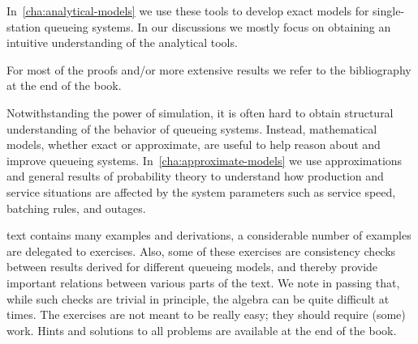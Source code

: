 \documentclass[queueing-book.tex]{subfiles}
\begin{document}
In~\cref{cha:analytical-models} we use these tools to develop exact models for single-station queueing systems.
In our discussions we mostly focus on obtaining an intuitive understanding of the analytical tools.

For most of the  proofs and/or more extensive results we refer to the bibliography at the end of the book.

Notwithstanding the power of simulation, it is often hard to obtain structural understanding of the behavior of queueing systems.
Instead, mathematical models, whether exact or approximate, are useful to help reason about and improve queueing systems.
In~\cref{cha:approximate-models} we use approximations and general results of probability theory to understand how production and service situations are affected by the system parameters such as service speed, batching rules, and outages.


 text contains many examples and derivations, a considerable number of examples are delegated to exercises.
Also, some of these exercises are consistency checks between results derived for different queueing models, and thereby provide important relations between various parts of the text.
We note in passing that, while such checks are trivial in principle, the algebra can be quite difficult at times.
The exercises are not meant to be really easy; they should require (some) work.
Hints and solutions to all problems are available at the end of the book.




\end{document}
